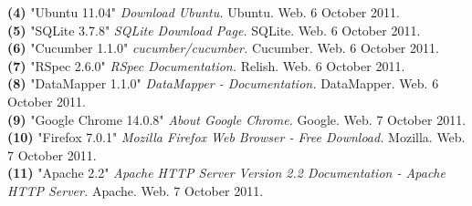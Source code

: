 \documentclass{article}
\begin{document}
\noindent\hangindent=1.4cm
\textbf{(4)} "Ubuntu 11.04" 
\emph{Download Ubuntu.} Ubuntu. Web.  6 October 2011.\\

\noindent\hangindent=1.4cm
\textbf{(5)} "SQLite 3.7.8" 
\emph{SQLite Download Page.} SQLite. Web.  6 October 2011.\\

\noindent\hangindent=1.4cm
\textbf{(6)} "Cucumber 1.1.0" 
\emph{cucumber/cucumber.} Cucumber. Web.  6 October 2011.\\

\noindent\hangindent=1.4cm
\textbf{(7)} "RSpec 2.6.0" 
\emph{RSpec Documentation.} Relish. Web.  6 October 2011.\\

\noindent\hangindent=1.4cm
\textbf{(8)} "DataMapper 1.1.0" 
\emph{DataMapper - Documentation.} DataMapper. Web.  6 October 2011.\\

\noindent\hangindent=1.4cm
\textbf{(9)} "Google Chrome 14.0.8" 
\emph{About Google Chrome.} Google. Web.  7 October 2011.\\

\noindent\hangindent=1.4cm
\textbf{(10)} "Firefox 7.0.1" 
\emph{Mozilla Firefox Web Browser - Free Download.} Mozilla. Web.  7 October 2011.\\

\noindent\hangindent=1.4cm
\textbf{(11)} "Apache 2.2" 
\emph{Apache HTTP Server Version 2.2 Documentation - Apache HTTP Server.} Apache. Web.  7 October 2011.\\
\end{document}
